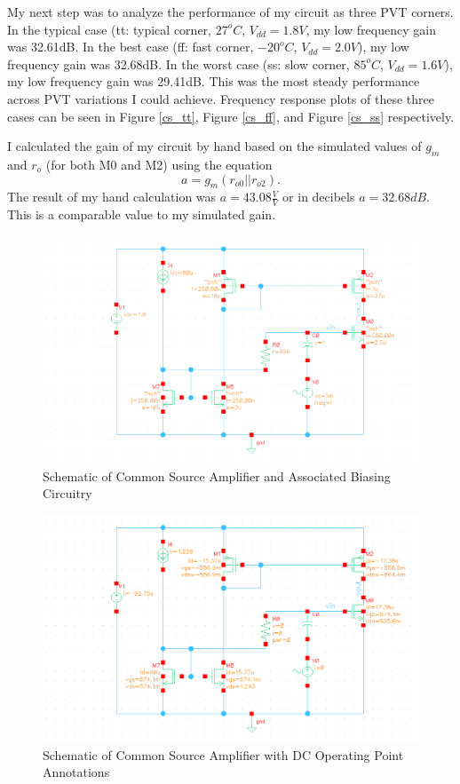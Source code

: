 \documentclass{article}
\begin{document}
My next step was to analyze the performance of my circuit as three PVT corners. In the typical case (tt: typical corner, $27^oC$, $V_{dd} = 1.8V$, my low frequency gain was 32.61dB. In the best case (ff: fast corner, $-20^oC$, $V_{dd} = 2.0V$), my low frequency gain was 32.68dB. In the worst case (ss: slow corner, $85^oC$, $V_{dd} = 1.6V$), my low frequency gain was 29.41dB. This was the most steady performance across PVT variations I could achieve. Frequency response plots of these three cases can be seen in Figure \ref{cs_tt}, Figure \ref{cs_ff}, and Figure \ref{cs_ss} respectively.

I calculated the gain of my circuit by hand based on the simulated values of $g_m$ and $r_o$ (for both M0 and M2) using the equation
\begin{equation}
a = g_m(r_{o0} || r_{o2}).
\end{equation}
The result of my hand calculation was $a = 43.08\frac{V}{V}$ or in decibels $a = 32.68dB$. This is a comparable value to my simulated gain.

\begin{figure}[H]
\centering
\includegraphics[width=7in]{2_cs_schematic.png}
\caption{Schematic of Common Source Amplifier and Associated Biasing Circuitry}
\label{cs_schem}
\end{figure}

\begin{figure}[H]
\centering
\includegraphics[width=7in]{2_cs_dcop.png}
\caption{Schematic of Common Source Amplifier with DC Operating Point Annotations}
\label{cs_dcop}
\end{figure}
\end{document}
